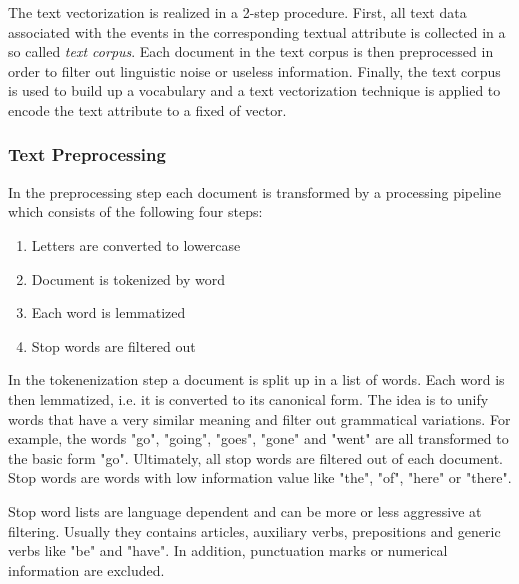 The text vectorization is realized in a 2-step procedure.
First, all text data associated with the events in the corresponding textual attribute is collected in a so called \textit{text corpus}.
Each document in the text corpus is then preprocessed in order to filter out linguistic noise or useless information.
Finally, the text corpus is used to build up a vocabulary and a text vectorization technique is applied to encode the text attribute to a fixed of vector.

\subsubsection{Text Preprocessing}

In the preprocessing step each document is transformed by a processing pipeline which consists of the following four steps:

\begin{enumerate} 
	\item Letters are converted to lowercase
	\item Document is tokenized by word
	\item Each word is lemmatized
	\item Stop words are filtered out
\end{enumerate}

In the tokenenization step a document is split up in a list of words.
Each word is then lemmatized, i.e. it is converted to its canonical form.
The idea is to unify words that have a very similar meaning and filter out grammatical variations.
For example, the words  "go", "going", "goes", "gone" and "went" are all transformed to the basic form "go".
Ultimately, all stop words are filtered out of each document.
Stop words are words with low information value like "the", "of", "here" or "there".

Stop word lists are language dependent and can be more or less aggressive at filtering.
Usually they contains articles, auxiliary verbs, prepositions and generic verbs like "be" and "have".
In addition, punctuation marks or numerical information are excluded.


